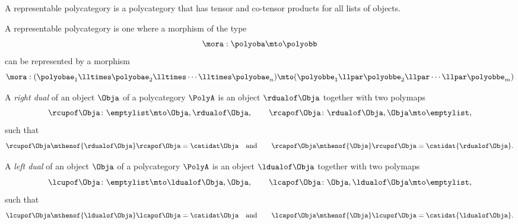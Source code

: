 \begin{ctdefinition}
    \label{def:representable-polycategory}
    A representable polycategory is a polycategory that has tensor and co-tensor products for all lists of objects.
\end{ctdefinition}

A representable polycategory is one where a morphism of the type
\begin{equation}\label{eq:polymora}
    \mora: \polyoba \mto \polyobb
\end{equation}
can be represented by a morphism
\begin{equation}\label{eq:polymora-tensors}
    \mora: (\polyobae_1 \lltimes \polyobae_2 \lltimes \cdots \lltimes \polyobae_n) \mto
    (\polyobbe_1 \llpar \polyobbe_2 \llpar \cdots \llpar \polyobbe_m )
\end{equation}

\begin{ctdefinition}
    \label{def:right-duals-polycategory}
    A \emph{right dual} of an object $\Obja$ of a polycategory $\PolyA$ is an object $\rdualof\Obja$
    together with two polymaps
    \begin{equation}
        \rcupof\Obja \colon \emptylist \mto \Obja, \rdualof\Obja,
        \qquad
        \rcapof\Obja \colon \rdualof\Obja , \Obja \mto \emptylist,
    \end{equation}
    such that
    \begin{equation}
        \rcupof\Obja \mthenof{\rdualof\Obja} \rcapof\Obja = \catidat\Obja
        \quad\text{and}\qquad
        \rcapof\Obja \mthenof{\Obja} \rcupof\Obja = \catidat{\rdualof\Obja}.
    \end{equation}
\end{ctdefinition}

\begin{ctdefinition}
    \label{def:left-duals-polycategory}
    A \emph{left dual} of an object $\Obja$ of a polycategory $\PolyA$ is an object $\ldualof\Obja$
    together with two polymaps
    \begin{equation}
        \lcupof\Obja \colon \emptylist \mto \ldualof\Obja, \Obja,
        \qquad
        \lcapof\Obja \colon \Obja , \ldualof\Obja \mto \emptylist,
    \end{equation}
    such that
    \begin{equation}
        \lcupof\Obja \mthenof{\ldualof\Obja} \lcapof\Obja = \catidat\Obja
        \quad\text{and}\qquad
        \lcapof\Obja \mthenof{\Obja} \lcupof\Obja = \catidat{\ldualof\Obja}.
    \end{equation}
\end{ctdefinition}

